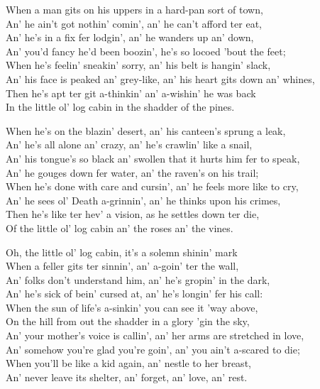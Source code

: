
\begin{poemblock}
When a man gits on his uppers in a hard-pan sort of town,\\
\idt An' he ain't got nothin' comin', an' he can't afford ter eat,\\
An' he's in a fix fer lodgin', an' he wanders up an' down,\\
\idt An' you'd fancy he'd been boozin', he's so locoed 'bout the feet;\\
When he's feelin' sneakin' sorry, an' his belt is hangin' slack,\\
\idt An' his face is peaked an' grey-like, an' his heart gits down an' whines,\\
Then he's apt ter git a-thinkin' an' a-wishin' he was back\\
\idt In the little ol' log cabin in the shadder of the pines.

When he's on the blazin' desert, an' his canteen's sprung a leak,\\
\idt An' he's all alone an' crazy, an' he's crawlin' like a snail,\\
An' his tongue's so black an' swollen that it hurts him fer to speak,\\
\idt An' he gouges down fer water, an' the raven's on his trail;\\
When he's done with care and cursin', an' he feels more like to cry,\\
\idt An' he sees ol' Death a-grinnin', an' he thinks upon his crimes,\\
Then he's like ter hev' a vision, as he settles down ter die,\\
\idt Of the little ol' log cabin an' the roses an' the vines.

Oh, the little ol' log cabin, it's a solemn shinin' mark\\
\idt When a feller gits ter sinnin', an' a-goin' ter the wall,\\
An' folks don't understand him, an' he's gropin' in the dark,\\
\idt An' he's sick of bein' cursed at, an' he's longin' fer his call:\\
When the sun of life's a-sinkin' you can see it 'way above,\\
\idt On the hill from out the shadder in a glory 'gin the sky,\\
An' your mother's voice is callin', an' her arms are stretched in love,\\
\idt An' somehow you're glad you're goin', an' you ain't a-scared to die;\\
When you'll be like a kid again, an' nestle to her breast,\\
\idt An' never leave its shelter, an' forget, an' love, an' rest.

\end{poemblock}
